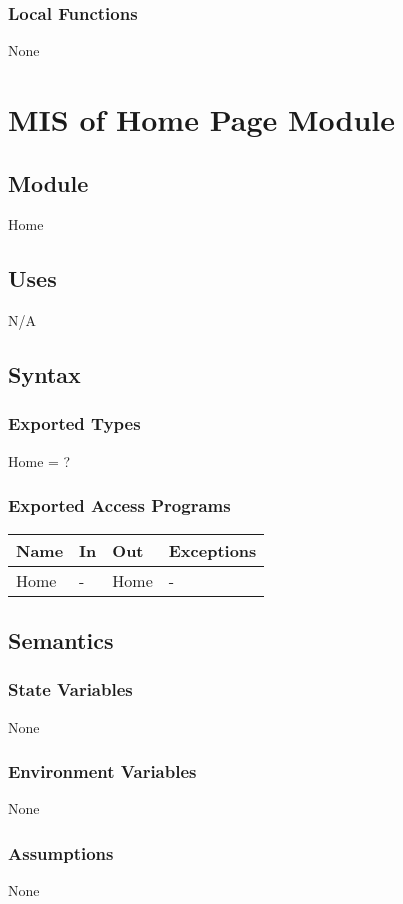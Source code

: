 \documentclass[12pt, titlepage]{article}
\begin{document}
\subsubsection{Local Functions}
None

\newpage

\section{MIS of Home Page Module} \label{HomePage}
\subsection{Module}
Home
\subsection{Uses}
N/A
\subsection{Syntax}
\subsubsection{Exported Types}
Home = ?
\subsubsection{Exported Access Programs}
\begin{center}
	\begin{tabular}{p{2cm} p{4cm} p{4cm} p{2cm}}
		\hline
		\textbf{Name} & \textbf{In} & \textbf{Out} & \textbf{Exceptions} \\
		\hline
		Home & - & Home & - \\
		\hline
	\end{tabular}
\end{center}
\subsection{Semantics}
\subsubsection{State Variables}
None
\subsubsection{Environment Variables}
None
\subsubsection{Assumptions}
None
\end{document}
